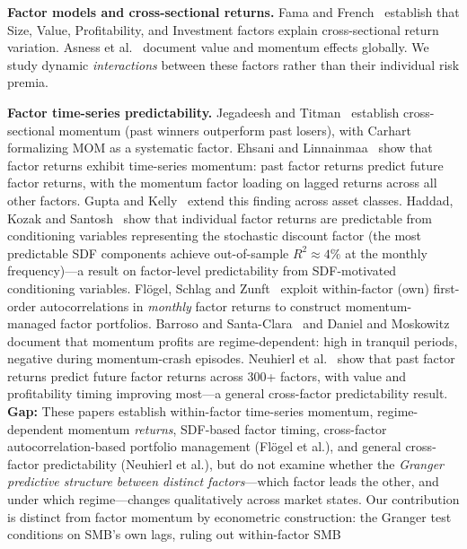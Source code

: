 \documentclass[sigconf,anonymous]{acmart}
\begin{document}
\textbf{Factor models and cross-sectional returns.}
Fama and French~\cite{fama1993common,fama2015five} establish that Size, Value,
Profitability, and Investment factors explain cross-sectional return variation.
Asness et al.~\cite{asness2013value} document value and momentum effects globally.
We study dynamic \emph{interactions} between these factors rather than their
individual risk premia.

\textbf{Factor time-series predictability.}
Jegadeesh and Titman~\cite{jegadeesh1993returns} establish cross-sectional momentum
(past winners outperform past losers), with Carhart~\cite{carhart1997persistence}
formalizing MOM as a systematic factor.
Ehsani and Linnainmaa~\cite{ehsani2022factor} show that factor returns exhibit
time-series momentum: past factor returns predict future factor returns, with the
momentum factor loading on lagged returns across all other factors.
Gupta and Kelly~\cite{gupta2019factor} extend this finding across asset classes.
Haddad, Kozak and Santosh~\cite{haddad2020factor} show that individual factor returns
are predictable from conditioning variables representing the stochastic discount factor
(the most predictable SDF components achieve out-of-sample $R^2 \approx 4\%$ at the monthly frequency)---a result on factor-level predictability from SDF-motivated conditioning variables.
Fl{\"o}gel, Schlag and Zunft~\cite{flogel2022momentum} exploit within-factor (own) first-order
autocorrelations in \emph{monthly} factor returns to construct momentum-managed factor portfolios.
Barroso and Santa-Clara~\cite{barroso2015momentum} and Daniel and
Moskowitz~\cite{daniel2016momentum} document that momentum profits are
regime-dependent: high in tranquil periods, negative during momentum-crash episodes.
Neuhierl et al.~\cite{neuhierl2024timing} show that past factor returns predict future
factor returns across 300+ factors, with value and profitability timing improving most---a
general cross-factor predictability result.
\textbf{Gap:} These papers establish within-factor time-series momentum,
regime-dependent momentum \emph{returns}, SDF-based factor timing, cross-factor
autocorrelation-based portfolio management (Fl{\"o}gel et al.), and general
cross-factor predictability (Neuhierl et al.), but do not examine whether the
\emph{Granger predictive structure between distinct factors}---which factor leads
the other, and under which regime---changes qualitatively across market states.
Our contribution is distinct from factor momentum by econometric construction:
the Granger test conditions on SMB's own lags, ruling out within-factor SMB
\end{document}

